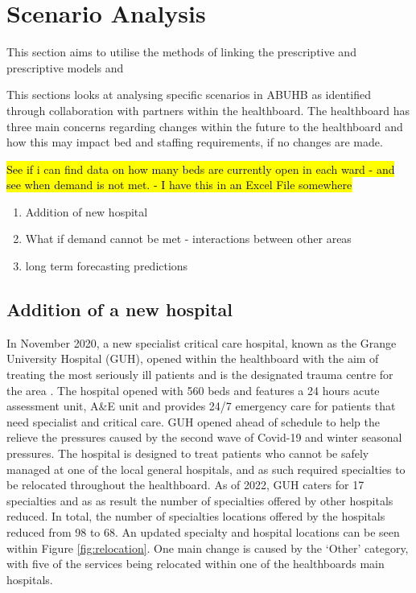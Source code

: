 \documentclass[../thesis.tex]{subfiles}
\begin{document}
\newpage



\section{Scenario Analysis}
This section aims to utilise the methods of linking the prescriptive and prescriptive models and 


This sections looks at analysing specific scenarios in ABUHB as identified through collaboration with partners within the healthboard. The healthboard has three main concerns regarding changes within the future to the healthboard and how this may impact bed and staffing requirements, if no changes are made.

\hl{See if i can find data on how many beds are currently open in each ward - and see when demand is not met. - I have this in an Excel File somewhere}

\begin{enumerate}
    \item Addition of new hospital
    \item What if demand cannot be met - interactions between other areas 
    \item long term forecasting predictions
\end{enumerate}


\subsection{Addition of a new hospital}\label{sec:scenario1}
In November 2020, a new specialist critical care hospital, known as the Grange University Hospital (GUH), opened within the healthboard with the aim of treating the most seriously ill patients and is the designated trauma centre for the area \cite{NHSWalesa}. The hospital opened with 560 beds and features a 24 hours acute assessment unit, A\&E unit and provides 24/7 emergency care for patients that need specialist and critical care. GUH opened ahead of schedule to help the relieve the pressures caused by the second wave of Covid-19 and winter seasonal pressures. The hospital is designed to treat patients who cannot be safely managed at one of the local general hospitals, and as such required specialties to be relocated throughout the healthboard. As of 2022, GUH caters for 17 specialties and as as result the number of specialties offered by other hospitals reduced. In total, the number of specialties locations offered by the hospitals reduced from 98 to 68. An updated specialty and hospital locations can be seen within Figure \ref{fig:relocation}. One main change is caused by the `Other' category, with five of the services being relocated within one of the healthboards main hospitals.
\end{document}
